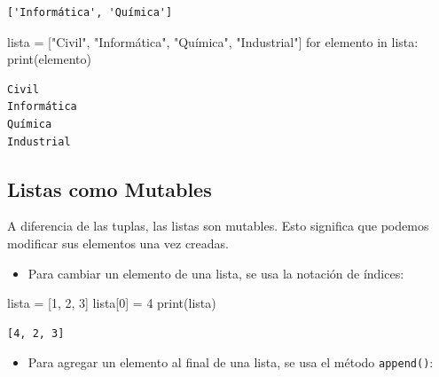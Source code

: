 \documentclass[
  letterpaper,
  DIV=11,
  numbers=noendperiod]{scrreprt}
\newenvironment{Shaded}{\begin{snugshade}}{\end{snugshade}}
\newcommand{\BuiltInTok}[1]{\textcolor[rgb]{0.00,0.23,0.31}{#1}}
\newcommand{\ControlFlowTok}[1]{\textcolor[rgb]{0.00,0.23,0.31}{#1}}
\newcommand{\DecValTok}[1]{\textcolor[rgb]{0.68,0.00,0.00}{#1}}
\newcommand{\KeywordTok}[1]{\textcolor[rgb]{0.00,0.23,0.31}{#1}}
\newcommand{\NormalTok}[1]{\textcolor[rgb]{0.00,0.23,0.31}{#1}}
\newcommand{\OperatorTok}[1]{\textcolor[rgb]{0.37,0.37,0.37}{#1}}
\newcommand{\StringTok}[1]{\textcolor[rgb]{0.13,0.47,0.30}{#1}}
\providecommand{\tightlist}{%
  \setlength{\itemsep}{0pt}\setlength{\parskip}{0pt}}\usepackage{longtable,booktabs,array}
\begin{document}
\begin{verbatim}
['Informática', 'Química']
\end{verbatim}

\begin{Shaded}
\begin{Highlighting}[]
\NormalTok{lista }\OperatorTok{=}\NormalTok{ [}\StringTok{"Civil"}\NormalTok{, }\StringTok{"Informática"}\NormalTok{, }\StringTok{"Química"}\NormalTok{, }\StringTok{"Industrial"}\NormalTok{]}
\ControlFlowTok{for}\NormalTok{ elemento }\KeywordTok{in}\NormalTok{ lista:}
    \BuiltInTok{print}\NormalTok{(elemento)}
\end{Highlighting}
\end{Shaded}

\begin{verbatim}
Civil
Informática
Química
Industrial
\end{verbatim}

\hypertarget{listas-como-mutables}{%
\subsection{Listas como Mutables}\label{listas-como-mutables}}

A diferencia de las tuplas, las listas son mutables. Esto significa que
podemos modificar sus elementos una vez creadas.

\begin{itemize}
\tightlist
\item
  Para cambiar un elemento de una lista, se usa la notación de índices:
\end{itemize}

\begin{Shaded}
\begin{Highlighting}[]
\NormalTok{lista }\OperatorTok{=}\NormalTok{ [}\DecValTok{1}\NormalTok{, }\DecValTok{2}\NormalTok{, }\DecValTok{3}\NormalTok{]}
\NormalTok{lista[}\DecValTok{0}\NormalTok{] }\OperatorTok{=} \DecValTok{4}
\BuiltInTok{print}\NormalTok{(lista)}
\end{Highlighting}
\end{Shaded}

\begin{verbatim}
[4, 2, 3]
\end{verbatim}

\begin{itemize}
\tightlist
\item
  Para agregar un elemento al final de una lista, se usa el método
  \texttt{append()}:
\end{itemize}
\end{document}
